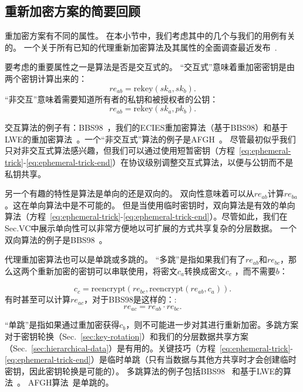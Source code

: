 \documentclass[longbibliography,nofootinbib]{revtex4-1}
\begin{document}
\begin{CJK*}{UTF8}{gbsn}
\subsection{重新加密方案的简要回顾}

重加密方案有不同的属性。 在本小节中，我们考虑其中的几个与我们的用例有关的。 一个关于所有已知的代理重新加密算法及其属性的全面调查最近发布~\cite{nunez2017proxy}.

要考虑的重要属性之一是算法是否是交互式的。 “交互式”意味着重加密密钥是由两个密钥计算出来的：
\begin{equation}
    re_{ab} = \text{rekey}(sk_a, sk_b).
\end{equation}
“非交互”意味着需要知道所有者的私钥和被授权者的公钥：
\begin{equation}
    re_{ab} = \text{rekey}(sk_a, pk_b).
\end{equation}

交互算法的例子有：BBS98~\cite{BBS98}，我们的ECIES重加密算法（基于BBS98）和基于LWE的重加密算法~\cite{lwe-reencryption}。一个“非交互式”算法的例子是AFGH~\cite{AFGH}。 尽管最初似乎我们只对非交互式算法感兴趣，但我们可以通过使用短暂密钥（方程~\ref{eq:ephemeral-trick}-\ref{eq:ephemeral-trick-end}）在协议级别调整交互式算法，以便与公钥而不是私钥共享。

另一个有趣的特性是算法是单向的还是双向的。 双向性意味着可以从$re_{ab}$计算$re_{ba}$。这在单向算法中是不可能的。 但是当使用临时密钥时，双向算法是有效的单向算法（方程~\ref{eq:ephemeral-trick}-\ref{eq:ephemeral-trick-end}）。尽管如此，我们在Sec.VC中展示单向性可以非常方便地以可扩展的方式共享复杂的分层数据。 一个双向算法的例子是BBS98~\cite{BBS98}。

    代理重加密算法也可以是单跳或多跳的。 “多跳”是指如果我们有了$re_{ab}$和$re_{bc}$，那么这两个重新加密的密钥可以串联使用，将密文$c_a$转换成密文$c_c$ ，而不需要$b$：

\begin{equation}
    c_c = \text{reencrypt}(re_{bc}, \text{reencrypt}(re_{ab}, c_a)).
\end{equation}
有时甚至可以计算$re_{ac}$，对于BBS98是这样的：:
\begin{equation}
    re_{ac} = re_{ab} \cdot re_{bc}.
\end{equation}

“单跳”是指如果通过重加密获得$c_b$，则不可能进一步对其进行重新加密。多跳方案对于密钥轮换（Sec.~\ref{sec:key-rotation}）和我们的分层数据共享方案（Sec.~\ref{sec:hierarchical-data}）是有用的。关键技巧（方程~\ref{eq:ephemeral-trick}-\ref{eq:ephemeral-trick-end}）是临时单跳（只有当数据与其他方共享时才会创建临时密钥，因此密钥轮换是可能的）。 多跳算法的例子包括BBS98~\cite{BBS98} 和基于LWE的算法~\cite{lwe-reencryption}。 AFGH算法~\cite{AFGH}是单跳的。


\end{CJK*}
\end{document}
